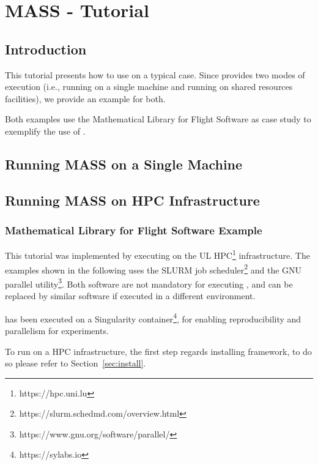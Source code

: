 
\chapter{MASS - Tutorial}

\section{Introduction}

This tutorial presents how to use \MASS on a typical case. Since \MASS provides two modes of execution (i.e., running \MASS on a single machine and running \MASS on shared resources facilities), we provide an example for both.

Both examples use the Mathematical Library for Flight Software as case study to exemplify the use of \FAQAS.

\section{Running MASS on a Single Machine}







\section{Running MASS on HPC Infrastructure}

\subsection{Mathematical Library for Flight Software Example}

This tutorial was implemented by executing \MASS on the UL HPC\footnote{https://hpc.uni.lu} infrastructure.
The examples shown in the following uses the SLURM job scheduler\footnote{https://slurm.schedmd.com/overview.html} and the GNU parallel utility\footnote{https://www.gnu.org/software/parallel/}. Both software are not mandatory for executing \MASS, and can be replaced by similar software if executed in a different environment.

\MASS has been executed on a Singularity container\footnote{https://sylabs.io}, for enabling reproducibility and parallelism for experiments.

To run \MASS on a HPC infrastructure, the first step regards installing \MASS framework, to do so please refer to Section~\ref{sec:install}.

